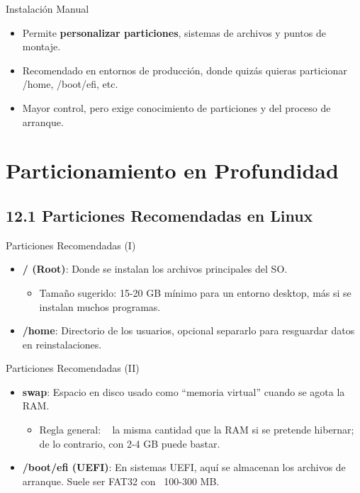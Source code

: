 \documentclass{beamer}
\begin{document}
\begin{frame}{Instalación Manual}
    \begin{itemize}
        \item Permite \textbf{personalizar particiones}, sistemas de archivos y puntos de montaje.
        \item Recomendado en entornos de producción, donde quizás quieras particionar /home, /boot/efi, etc.
        \item Mayor control, pero exige conocimiento de particiones y del proceso de arranque.
    \end{itemize}
\end{frame}

\section{Particionamiento en Profundidad}

\subsection{12.1 Particiones Recomendadas en Linux}
\begin{frame}{Particiones Recomendadas (I)}
    \begin{itemize}
        \item \textbf{/ (Root)}: Donde se instalan los archivos principales del SO.
        \begin{itemize}
            \item Tamaño sugerido: 15-20 GB mínimo para un entorno desktop, más si se instalan muchos programas.
        \end{itemize}
        \item \textbf{/home}: Directorio de los usuarios, opcional separarlo para resguardar datos en reinstalaciones.
    \end{itemize}
\end{frame}

\begin{frame}{Particiones Recomendadas (II)}
    \begin{itemize}
        \item \textbf{swap}: Espacio en disco usado como “memoria virtual” cuando se agota la RAM.
            \begin{itemize}
                \item Regla general: ~ la misma cantidad que la RAM si se pretende hibernar; de lo contrario, con 2-4 GB puede bastar.
            \end{itemize}
        \item \textbf{/boot/efi (UEFI)}: En sistemas UEFI, aquí se almacenan los archivos de arranque. Suele ser FAT32 con ~100-300 MB.
    \end{itemize}
\end{frame}
\end{document}

